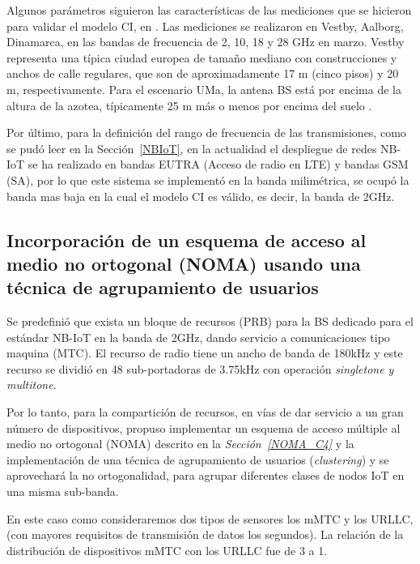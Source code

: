 Algunos parámetros siguieron las características de las mediciones que se hicieron para validar el modelo CI, en \parencite{Sun2016}. Las mediciones se realizaron en Vestby, Aalborg, Dinamarca, en las bandas de frecuencia de 2, 10, 18 y 28 GHz en marzo. Vestby representa una típica ciudad europea de tamaño mediano con construcciones y anchos de calle regulares, que son de aproximadamente 17 m (cinco pisos) y 20 m, respectivamente. Para el escenario UMa, la antena BS está por encima de la altura de la azotea, típicamente 25 m más o menos por encima del suelo \parencite{Sun2016}.\newline

Por último, para la definición del rango de frecuencia de las transmisiones, como se pudó leer en la Sección~\ref{NBIoT}, en la actualidad el despliegue de redes NB-IoT se ha realizado en bandas EUTRA (Acceso de radio en LTE) y bandas GSM (SA), por lo que este sistema se implementó en la banda milimétrica, se ocupó la banda mas baja en la cual el modelo CI es válido, es decir, la banda de 2GHz.

\subsection{Incorporación de un esquema de acceso al medio no ortogonal (NOMA) usando una técnica de agrupamiento de usuarios}
Se predefinió que exista un bloque de recursos (PRB) para la BS dedicado para el estándar NB-IoT en la banda de 2GHz, dando servicio a comunicaciones tipo maquina (MTC). El recurso de radio tiene un ancho de banda de 180kHz y este recurso se dividió en 48 sub-portadoras de 3.75kHz con operación \textit{singletone y multitone}.\newline

Por lo tanto, para la compartición de recursos, en vías de dar servicio a un gran número de dispositivos, propuso implementar un esquema de acceso múltiple al medio no ortogonal (NOMA) descrito en la \textit{Sección~\ref{NOMA_C4}} y la implementación de una técnica de agrupamiento de usuarios (\textit{clustering}) y se aprovechará la no ortogonalidad, para agrupar diferentes clases de nodos IoT en una misma sub-banda.\newline

En este caso como consideraremos dos tipos de sensores los mMTC y los URLLC, (con mayores requisitos de transmisión de datos los segundos). La relación de la distribución de dispositivos mMTC con los URLLC fue de 3 a 1.\newline

